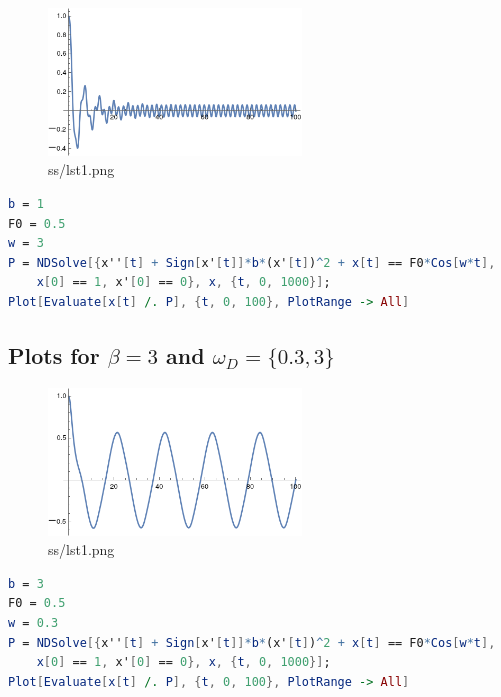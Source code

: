 \documentclass[12pt,letter]{article}
\begin{document}
{\begin{tcolorbox}
	\begin{figure}[H]
		\centering
		\includegraphics[width=0.6\textwidth]{ss/honky4.png}
		\caption{ss/lst1.png}
		\label{fig:ss-lst1-png}
	\end{figure}
\begin{lstlisting}[language=Mathematica]
b = 1
F0 = 0.5
w = 3
P = NDSolve[{x''[t] + Sign[x'[t]]*b*(x'[t])^2 + x[t] == F0*Cos[w*t], 
    x[0] == 1, x'[0] == 0}, x, {t, 0, 1000}];
Plot[Evaluate[x[t] /. P], {t, 0, 100}, PlotRange -> All] 
\end{lstlisting}
\end{tcolorbox}

\newpage
\subsection*{Plots for $\beta = 3$ and $\omega_D = \{0.3, 3\} $ }

\begin{tcolorbox}
	\begin{figure}[H]
		\centering
		\includegraphics[width=0.6\textwidth]{ss/honky5.png}
		\caption{ss/lst1.png}
		\label{fig:ss-lst1-png}
	\end{figure}
\begin{lstlisting}[language=Mathematica]
b = 3
F0 = 0.5
w = 0.3
P = NDSolve[{x''[t] + Sign[x'[t]]*b*(x'[t])^2 + x[t] == F0*Cos[w*t], 
    x[0] == 1, x'[0] == 0}, x, {t, 0, 1000}];
Plot[Evaluate[x[t] /. P], {t, 0, 100}, PlotRange -> All] 
\end{lstlisting}
\end{tcolorbox}



}
\end{document}
